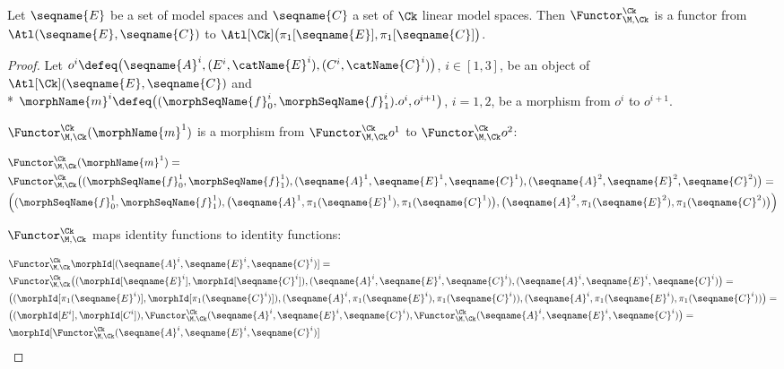 \documentclass{article}
\begin{document}
\begin{theorem}
\label{the:Func-M-Ck}
Let $\seqname{E}$ be a set of model spaces and $\seqname{C}$ a
set of $\Ck$ linear model spaces. Then
$\Functor^\Ck_{\M,\Ck}$ is a functor from
$\Atl(\seqname{E}, \seqname{C})$
to
$\Atl[\Ck] \bigl (\pi_1[\seqname{E}], \pi_1[\seqname{C}] \bigr )$.

\begin{proof}
Let
$
o^i \defeq
\bigl (
  \seqname{A}^i, (E^i,\catName{E}^i), (C^i,\catName{C}^i)
\bigr )
$,
$i \in [1,3]$, be an object of $\Atl[\Ck](\seqname{E}, \seqname{C})$ and \\*
$
\morphName{m}^i \defeq
  \bigl (
    (\morphSeqName{f}^i_0, \morphSeqName{f}^i_1).
    o^i,
    o^{i+1}
  \bigr )
$, $i=1,2$,
be a morphism from $o^i$ to $o^{i+1}$.

$\Functor^\Ck_{\M,\Ck} (\morphName{m}^1)$ is a morphism from
$\Functor^\Ck_{\M,\Ck} o^1$ to $\Functor^\Ck_{\M,\Ck} o^2$:

\begin{equation*}
\begin{split}
  &
\Functor^\Ck_{\M,\Ck} (\morphName{m}^1) =
\\*
  &
\Functor^\Ck_{\M,\Ck}
  \bigl (
    (
      \morphSeqName{f}^1_0,
      \morphSeqName{f}^1_1
    ),
    (\seqname{A}^1, \seqname{E}^1, \seqname{C}^1),
    (\seqname{A}^2, \seqname{E}^2, \seqname{C}^2)
  \bigr )
=
\\*
  &
  \Bigl (
    (
      \morphSeqName{f}^1_0,
      \morphSeqName{f}^1_1
    ),
    \bigl (
      \seqname{A}^1, \pi_1(\seqname{E}^1), \pi_1(\seqname{C}^1)
    \bigr ),
    \bigl (
      \seqname{A}^2, \pi_1(\seqname{E}^2), \pi_1(\seqname{C}^2)
    \bigr )
  \Bigr )
\end{split}
\end{equation*}

$\Functor^\Ck_{\M,\Ck}$ maps identity functions to identity functions:

\begin{equation*}
\begin{split}
  &
\Functor^\Ck_{\M,\Ck} \morphId[{{(\seqname{A}^i, \seqname{E}^i, \seqname{C}^i)}}]
=
\\*
  &
\Functor^\Ck_{\M,\Ck}
  \bigl (
    (\morphId[{\seqname{E}^i}], \morphId[{\seqname{C}^i}]),
    (\seqname{A}^i, \seqname{E}^i, \seqname{C}^i),
    (\seqname{A}^i, \seqname{E}^i, \seqname{C}^i)
  \bigr )
=
\\*
  &
  \bigl (
    (\morphId[{\pi_1(\seqname{E}^i)}], \morphId[{\pi_1(\seqname{C}^i)}]),
    (\seqname{A}^i, \pi_1(\seqname{E}^i), \pi_1(\seqname{C}^i)
    ),
    (\seqname{A}^i, \pi_1(\seqname{E}^i), \pi_1(\seqname{C}^i)
    )
  \bigr )
=
\\*
  &
  \bigl (
    (\morphId[{E^i}], \morphId[{C^i}]),
    \Functor^\Ck_{\M,\Ck} (\seqname{A}^i, \seqname{E}^i, \seqname{C}^i),
    \Functor^\Ck_{\M,\Ck} (\seqname{A}^i, \seqname{E}^i, \seqname{C}^i)
  \bigr )
=
\\*
  &
\morphId[{{\Functor^\Ck_{\M,\Ck} (\seqname{A}^i, \seqname{E}^i, \seqname{C}^i)}}]
\end{split}
\end{equation*}


\end{proof}
\end{theorem}
\end{document}
